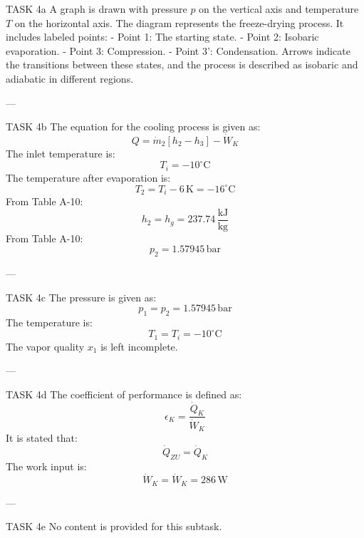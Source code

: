 TASK 4a  
A graph is drawn with pressure \( p \) on the vertical axis and temperature \( T \) on the horizontal axis. The diagram represents the freeze-drying process. It includes labeled points:  
- Point 1: The starting state.  
- Point 2: Isobaric evaporation.  
- Point 3: Compression.  
- Point 3': Condensation.  
Arrows indicate the transitions between these states, and the process is described as isobaric and adiabatic in different regions.

---

TASK 4b  
The equation for the cooling process is given as:  
\[
Q = \dot{m}_2 \left[ h_2 - h_3 \right] - \dot{W}_K
\]  
The inlet temperature is:  
\[
T_i = -10^\circ\text{C}
\]  
The temperature after evaporation is:  
\[
T_2 = T_i - 6 \, \text{K} = -16^\circ\text{C}
\]  
From Table A-10:  
\[
h_2 = h_g = 237.74 \, \frac{\text{kJ}}{\text{kg}}
\]  
From Table A-10:  
\[
p_2 = 1.57945 \, \text{bar}
\]

---

TASK 4c  
The pressure is given as:  
\[
p_1 = p_2 = 1.57945 \, \text{bar}
\]  
The temperature is:  
\[
T_1 = T_i = -10^\circ\text{C}
\]  
The vapor quality \( x_1 \) is left incomplete.

---

TASK 4d  
The coefficient of performance is defined as:  
\[
\epsilon_K = \frac{\dot{Q}_K}{\dot{W}_K}
\]  
It is stated that:  
\[
\dot{Q}_{ZU} = \dot{Q}_K
\]  
The work input is:  
\[
\dot{W}_K = \dot{W}_K = 286 \, \text{W}
\]

---

TASK 4e  
No content is provided for this subtask.